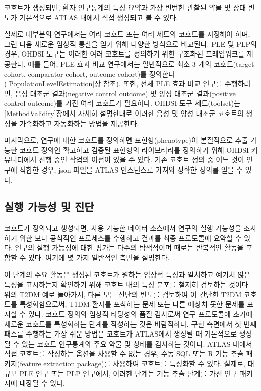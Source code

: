 \documentclass[11pt]{book}
\theoremstyle{definition}
\theoremstyle{definition}
\theoremstyle{definition}
\theoremstyle{remark}
\begin{document}
코호트가 생성되면, 환자 인구통계의 특성 요약과 가장 빈번한 관찰된 약물
및 상태 빈도가 기본적으로 ATLAS 내에서 직접 생성되고 볼 수 있다.

실제로 대부분의 연구에서는 여러 코호트 또는 여러 세트의 코호트를
지정해야 하며, 그런 다음 새로운 임상적 통찰을 얻기 위해 다양한 방식으로
비교된다. PLE 및 PLP의 경우, OHDSI 도구는 이러한 여러 코호트를 정의하기
위한 구조화된 프레임워크를 제공한다. 예를 들어, PLE 효과 비교 연구에서는
일반적으로 최소 3 개의 코호트(target cohort, comparator cohort, outcome
cohort)를 정의한다 (\ref{PopulationLevelEstimation}장 참조). 또한, 전체
PLE 효과 비교 연구를 수행하려면, 음성 대조군 결과(negative control
outcome) 및 양성 대조군 결과(positive control outcome)를 가진 여러
코호트가 필요하다. OHDSI 도구 세트(toolset)는 \ref{MethodValidity}장에서
자세히 설명한대로 이러한 음성 및 양성 대조군 코호트의 생성을 가속화하고
자동화하는 방법을 제공한다.

마지막으로, 연구에 대한 코호트를 정의하면 표현형(phenotype)이 본질적으로
추출 가능한 코호트 정의인 확고하고 검증된 표현형의 라이브러리를 정의하기
위해 OHDSI 커뮤니티에서 진행 중인 작업의 이점이 있을 수 있다. 기존
코호트 정의 중 어느 것이 연구에 적합한 경우, json 파일을 ATLAS
인스턴스로 가져와 정확한 정의를 얻을 수 있다.

\subsection{실행 가능성 및 진단}\label{Feasibility}

 

코호트가 정의되고 생성되면, 사용 가능한 데이터 소스에서 연구의 실행
가능성을 조사하기 위한 보다 공식적인 프로세스를 수행하고 결과를 최종
프로토콜에 요약할 수 있다. 연구의 실행 가능성에 대한 평가는 다수의
탐색적이며 때로는 반복적인 활동을 포함할 수 있다. 여기에 몇 가지
일반적인 측면을 설명한다.

이 단계의 주요 활동은 생성된 코호트가 원하는 임상적 특성과 일치하고
예기치 않은 특성을 표시하는지 확인하기 위해 코호트 내의 특성 분포를
철저히 검토하는 것이다. 위의 T2DM 예로 돌아가서, 다른 모든 진단의 빈도를
검토하여 이 간단한 T2DM 코호트를 특성화함으로써, T1DM 환자를 포착하는
문제 또는 다른 예상치 못한 문제를 표시할 수 있다. 코호트 정의의 임상적
타당성의 품질 검사로써 연구 프로토콜에 초기에 새로운 코호트를 특성화하는
단계를 작성하는 것은 바람직하다. 구현 측면에서 첫 번째 패스를 수행하는
가장 쉬운 방법은 코호트가 ATLAS에서 생성될 때 기본적으로 생성될 수 있는
코호트 인구통계와 주요 약물 및 상태를 검사하는 것이다. ATLAS 내에서 직접
코호트를 작성하는 옵션을 사용할 수 없는 경우, 수동 SQL 또는 R 기능 추출
패키지(feature extraction package)를 사용하여 코호트를 특성화할 수 있다.
실제로, 대규모 PLE 연구 또는 PLP 연구에서, 이러한 단계는 기능 추출
단계를 가진 연구 패키지에 내장될 수 있다.
\end{document}
